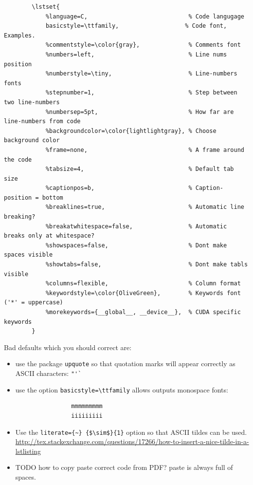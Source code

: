 \documentclass[12pt]{article}
\begin{document}
    \begin{lstlisting}
        \lstset{
            %language=C,                             % Code langugage
            basicstyle=\ttfamily,                   % Code font, Examples.
            %commentstyle=\color{gray},              % Comments font
            %numbers=left,                           % Line nums position
            %numberstyle=\tiny,                      % Line-numbers fonts
            %stepnumber=1,                           % Step between two line-numbers
            %numbersep=5pt,                          % How far are line-numbers from code
            %backgroundcolor=\color{lightlightgray}, % Choose background color
            %frame=none,                             % A frame around the code
            %tabsize=4,                              % Default tab size
            %captionpos=b,                           % Caption-position = bottom
            %breaklines=true,                        % Automatic line breaking?
            %breakatwhitespace=false,                % Automatic breaks only at whitespace?
            %showspaces=false,                       % Dont make spaces visible
            %showtabs=false,                         % Dont make tabls visible
            %columns=flexible,                       % Column format
            %keywordstyle=\color{OliveGreen},        % Keywords font ('*' = uppercase)
            %morekeywords={__global__, __device__},  % CUDA specific keywords
        }
    \end{lstlisting}

    Bad defaults which you should correct are:

    \begin{itemize}

        \item use the package \lstinline|upquote| so that quotation marks will appear
            correctly as ASCII characters: \lstinline|"'`|

        \item use the option \lstinline|basicstyle=\ttfamily| allows outputs monospace fonts:

            \begin{lstlisting}
                mmmmmmmmm
                iiiiiiiii
            \end{lstlisting}

        \item Use the \lstinline|literate={~} {$\sim$}{1}| option so that ASCII tildes can be used.
            \url{http://tex.stackexchange.com/questions/17266/how-to-insert-a-nice-tilde-in-a-lstlisting}

        \item TODO how to copy paste correct code from PDF? paste is always full of spaces.

    \end{itemize}
\end{document}
